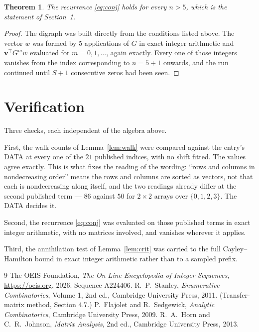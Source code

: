 \documentclass[11pt,a4paper]{article}
\theoremstyle{plain}
\newtheorem{theorem}{Theorem}
\theoremstyle{definition}
\begin{document}
\begin{theorem}
The recurrence \eqref{eq:conj} holds for every $n>5$, which is the statement of
Section~1.
\end{theorem}

\begin{proof}
The digraph was built directly from the conditions listed above. The vector $w$ was formed by
$5$ applications of $G$ in exact integer arithmetic and $\mathbf{v}^{\!\top}G^{m}w$
evaluated for $m=0,1,\dots$, again exactly. Every one of those integers vanishes from the
index corresponding to $n=5+1$ onwards, and the run continued until $S+1$ consecutive
zeros had been seen.
\end{proof}

\section{Verification}

Three checks, each independent of the algebra above.

First, the walk counts of Lemma~\ref{lem:walk} were compared against the entry's DATA at
every one of the $21$ published indices, with no shift fitted. The values agree exactly.
This is what fixes the reading of the wording: ``rows and columns in nondecreasing order''
means the rows and columns are sorted as vectors, not that each is nondecreasing along
itself, and the two readings already differ at the second published term --- $86$ against
$50$ for $2\times2$ arrays over $\{0,1,2,3\}$. The DATA decides it.

Second, the recurrence \eqref{eq:conj} was evaluated on those published terms in exact
integer arithmetic, with no matrices involved, and vanishes wherever it applies.

Third, the annihilation test of Lemma~\ref{lem:crit} was carried to the full
Cayley--Hamilton bound in exact integer arithmetic rather than to a sampled prefix.

\begin{thebibliography}{9}
 The OEIS Foundation, \emph{The On-Line Encyclopedia of Integer
Sequences}, \url{https://oeis.org}, 2026. Sequence A224406.
 R.~P.~Stanley, \emph{Enumerative Combinatorics}, Volume 1, 2nd ed.,
Cambridge University Press, 2011. (Transfer-matrix method, Section 4.7.)
 P.~Flajolet and R.~Sedgewick, \emph{Analytic Combinatorics}, Cambridge
University Press, 2009.
 R.~A.~Horn and C.~R.~Johnson, \emph{Matrix Analysis}, 2nd ed., Cambridge
University Press, 2013.
\end{thebibliography}
\end{document}
